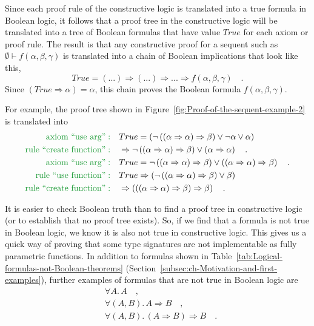 Since each proof rule of the constructive logic is translated into
a true formula in Boolean logic, it follows that a proof tree in the
constructive logic will be translated into a tree of Boolean formulas
that have value $True$ for each axiom or proof rule. The result is
that any constructive proof for a sequent such as $\emptyset\vdash f(\alpha,\beta,\gamma)$
is translated into a chain of Boolean implications that look like
this,
\[
True=(...)\Rightarrow(...)\Rightarrow...\Rightarrow f(\alpha,\beta,\gamma)\quad.
\]
Since $\left(True\Rightarrow\alpha\right)=\alpha$, this chain proves
the Boolean formula $f(\alpha,\beta,\gamma)$.

For example, the proof tree shown in Figure~\ref{fig:Proof-of-the-sequent-example-2}
is translated into
\begin{align*}
{\color{greenunder}\text{axiom ``use arg''}:}\quad & True=\left(\neg\left(\left(\alpha\Rightarrow\alpha\right)\Rightarrow\beta\right)\vee\neg\alpha\vee\alpha\right)\\
{\color{greenunder}\text{rule ``create function''}:}\quad & \Rightarrow\neg\left(\left(\alpha\Rightarrow\alpha\right)\Rightarrow\beta\right)\vee\left(\alpha\Rightarrow\alpha\right)\quad.\\
{\color{greenunder}\text{axiom ``use arg''}:}\quad & True=\neg\left(\left(\alpha\Rightarrow\alpha\right)\Rightarrow\beta\right)\vee\left(\left(\alpha\Rightarrow\alpha\right)\Rightarrow\beta\right)\quad.\\
{\color{greenunder}\text{rule ``use function''}:}\quad & True\Rightarrow\left(\neg\left(\left(\alpha\Rightarrow\alpha\right)\Rightarrow\beta\right)\vee\beta\right)\\
{\color{greenunder}\text{rule ``create function''}:}\quad & \Rightarrow\left(\left(\left(\alpha\Rightarrow\alpha\right)\Rightarrow\beta\right)\Rightarrow\beta\right)\quad.
\end{align*}

It is easier to check Boolean truth than to find a proof tree in constructive
logic (or to establish that no proof tree exists). So, if we find
that a formula is not true in Boolean logic, we know it is also not
true in constructive logic. This gives us a quick way of proving that
some type signatures are not implementable as fully parametric functions.
In addition to formulas shown in Table~\ref{tab:Logical-formulas-not-Boolean-theorems}
(Section~\ref{subsec:ch-Motivation-and-first-examples}), further
examples of formulas that are not true in Boolean logic are
\begin{align*}
 & \forall A.\,A\quad,\\
 & \forall(A,B).\,A\Rightarrow B\quad,\\
 & \forall(A,B).\,(A\Rightarrow B)\Rightarrow B\quad.
\end{align*}

